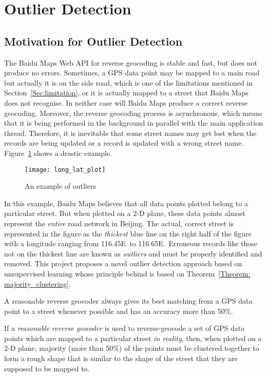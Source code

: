 \section{Outlier Detection}\label{outlier_detecting}
\subsection{Motivation for Outlier Detection}
The Baidu Maps Web API for reverse geocoding is stable and fast, but does not produce no errors. Sometimes, a GPS data point may be mapped to a main road but actually it is on the side road, which is one of the limitations mentioned in Section~\ref{Sec:limitation}, or it is actually mapped to a street that Baidu Maps does not recognise. In neither case will Baidu Maps produce a correct reverse geocoding. Moreover, the reverse geocoding process is asynchronous, which means that it is being performed in the background in parallel with the main application thread. Therefore, it is inevitable that some street names may get lost when the records are being updated or a record is updated with a wrong street name. Figure~\ref{Fig:exmp_outlier} shows a drastic example.

\begin{figure}[h!]
\texttt{[image: long\_lat\_plot]}
\centering
\caption{An example of outliers}\label{Fig:exmp_outlier}
\end{figure}

In this example, Baidu Maps believes that all data points plotted belong to a particular street. But when plotted on a 2-D plane, these data points almost represent the \emph{entire} road network in Beijing. The actual, correct street is represented in the figure as the \emph{thickest} blue line on the right half of the figure with a longitude ranging from 116.45\textdegree E~to 116.65\textdegree E.~Erroneous records like those not on the thickest line are known as \emph{outliers} and must be properly identified and removed. This project proposes a novel outlier detection approach based on unsupervised learning whose principle behind is based on Theorem~\ref{Theorem: majority_clustering}.

\begin{defn}\label{Def:reasonable_geocoder}
A reasonable reverse geocoder always gives its best matching from a GPS data point to a street whenever possible and has an accuracy more than 50\%.
\end{defn}

\begin{theorem}\label{Theorem: majority_clustering}
If a \emph{reasonable reverse geocoder} is used to reverse-geocode a set of GPS data points which are mapped to a particular street \emph{in reality}, then, when plotted on a 2-D plane, majority (more than 50\%) of the points must be clustered together to form a rough shape that is similar to the shape of the street that they are supposed to be mapped to. 
\end{theorem}

